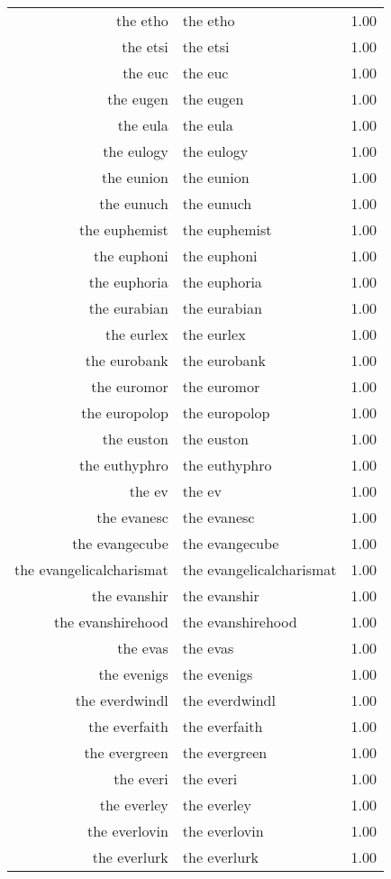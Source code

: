 \begin{table}[ht]
\begin{tabular}{rlr}
  the etho & the etho & 1.00 \\ 
  the etsi & the etsi & 1.00 \\ 
  the euc & the euc & 1.00 \\ 
  the eugen & the eugen & 1.00 \\ 
  the eula & the eula & 1.00 \\ 
  the eulogy & the eulogy & 1.00 \\ 
  the eunion & the eunion & 1.00 \\ 
  the eunuch & the eunuch & 1.00 \\ 
  the euphemist & the euphemist & 1.00 \\ 
  the euphoni & the euphoni & 1.00 \\ 
  the euphoria & the euphoria & 1.00 \\ 
  the eurabian & the eurabian & 1.00 \\ 
  the eurlex & the eurlex & 1.00 \\ 
  the eurobank & the eurobank & 1.00 \\ 
  the euromor & the euromor & 1.00 \\ 
  the europolop & the europolop & 1.00 \\ 
  the euston & the euston & 1.00 \\ 
  the euthyphro & the euthyphro & 1.00 \\ 
  the ev & the ev & 1.00 \\ 
  the evanesc & the evanesc & 1.00 \\ 
  the evangecube & the evangecube & 1.00 \\ 
  the evangelicalcharismat & the evangelicalcharismat & 1.00 \\ 
  the evanshir & the evanshir & 1.00 \\ 
  the evanshirehood & the evanshirehood & 1.00 \\ 
  the evas & the evas & 1.00 \\ 
  the evenigs & the evenigs & 1.00 \\ 
  the everdwindl & the everdwindl & 1.00 \\ 
  the everfaith & the everfaith & 1.00 \\ 
  the evergreen & the evergreen & 1.00 \\ 
  the everi & the everi & 1.00 \\ 
  the everley & the everley & 1.00 \\ 
  the everlovin & the everlovin & 1.00 \\ 
  the everlurk & the everlurk & 1.00 \\ 

\end{tabular}
\end{table}
